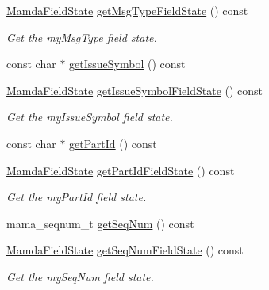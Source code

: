 \begin{CompactItemize}
\item 
\hyperlink{namespaceWombat_93aac974f2ab713554fd12a1fa3b7d2a}{Mamda\-Field\-State} \hyperlink{classWombat_1_1MamdaOrderImbalanceListener_69ecc694f33d3fb39064a3fa1b0d8ef3}{get\-Msg\-Type\-Field\-State} () const 
\begin{CompactList}\small\item\em Get the my\-Msg\-Type field state. \item\end{CompactList}\item 
const char $\ast$ \hyperlink{classWombat_1_1MamdaOrderImbalanceListener_3cbc1356e4c8a1e6287aa4fd39124cbd}{get\-Issue\-Symbol} () const 
\item 
\hyperlink{namespaceWombat_93aac974f2ab713554fd12a1fa3b7d2a}{Mamda\-Field\-State} \hyperlink{classWombat_1_1MamdaOrderImbalanceListener_e65164421eb2d6835ada9d3185734021}{get\-Issue\-Symbol\-Field\-State} () const 
\begin{CompactList}\small\item\em Get the my\-Issue\-Symbol field state. \item\end{CompactList}\item 
const char $\ast$ \hyperlink{classWombat_1_1MamdaOrderImbalanceListener_2f47719f14e5d1280791c8d832522589}{get\-Part\-Id} () const 
\item 
\hyperlink{namespaceWombat_93aac974f2ab713554fd12a1fa3b7d2a}{Mamda\-Field\-State} \hyperlink{classWombat_1_1MamdaOrderImbalanceListener_d8f5442d6f66c8a21c32581c66033146}{get\-Part\-Id\-Field\-State} () const 
\begin{CompactList}\small\item\em Get the my\-Part\-Id field state. \item\end{CompactList}\item 
mama\_\-seqnum\_\-t \hyperlink{classWombat_1_1MamdaOrderImbalanceListener_dc73bf6c66194774ffd211ab9fb44b6c}{get\-Seq\-Num} () const 
\item 
\hyperlink{namespaceWombat_93aac974f2ab713554fd12a1fa3b7d2a}{Mamda\-Field\-State} \hyperlink{classWombat_1_1MamdaOrderImbalanceListener_59ef970a6b416d746105d9e766c1d1a8}{get\-Seq\-Num\-Field\-State} () const 
\begin{CompactList}\small\item\em Get the my\-Seq\-Num field state. \item\end{CompactList}\item 

\end{CompactItemize}
